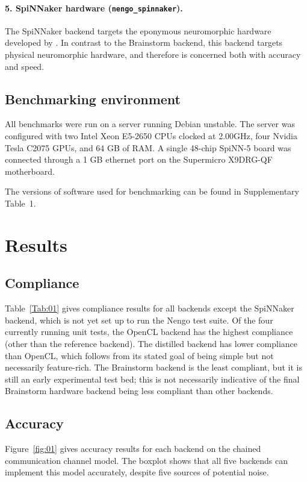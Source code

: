 \documentclass{frontiersSCNS}
\begin{document}
\paragraph{5. SpiNNaker hardware (\texttt{nengo\_spinnaker}).}
The SpiNNaker backend \cite{mundyinpress}
targets the eponymous neuromorphic hardware
developed by \citeauthor{furber2014}.
In contrast to the Brainstorm backend,
this backend targets physical neuromorphic hardware,
and therefore is concerned
both with accuracy and speed.

\subsection{Benchmarking environment}

All benchmarks were run on a server
running Debian unstable.
The server was configured with
two Intel Xeon E5-2650 CPUs
clocked at 2.00GHz,
four Nvidia Tesla C2075 GPUs,
and 64 GB of RAM.
A single 48-chip SpiNN-5 board
was connected through
a 1 GB ethernet port on
the Supermicro X9DRG-QF motherboard.

The versions of software
used for benchmarking can be found in
Supplementary Table~1.

\section{Results}

\subsection{Compliance}

Table~\ref{Tab:01} gives compliance results for
all backends except the SpiNNaker backend,
which is not yet set up to run the Nengo test suite.
Of the four currently running unit tests,
the OpenCL backend has the highest compliance
(other than the reference backend).
The distilled backend has lower compliance
than OpenCL, which follows from its stated goal
of being simple but not necessarily feature-rich.
The Brainstorm backend is the least compliant,
but it is still an early experimental test bed;
this is not necessarily indicative of the
final Brainstorm hardware backend being
less compliant than other backends.

\subsection{Accuracy}

Figure~\ref{fig:01} gives accuracy results
for each backend on the chained communication channel model.
The boxplot shows that all five backends can
implement this model accurately,
despite five sources of potential noise.
\end{document}
